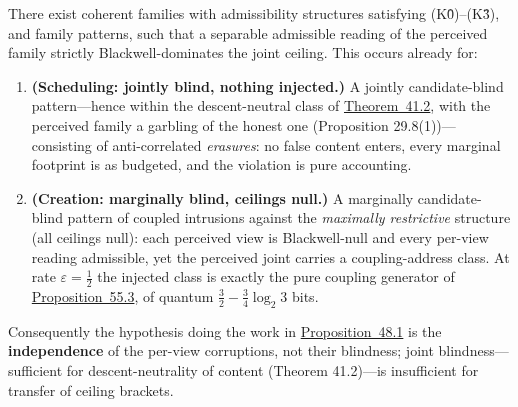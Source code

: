 \begin{thmplain}

There exist coherent families with admissibility structures satisfying (K0̂)--(K3̂), and family patterns, such that a separable admissible reading of the perceived family strictly Blackwell-dominates the joint ceiling. This occurs already for:

\begin{enumerate}
\def\labelenumi{\arabic{enumi}.}
\tightlist
\item
  \textbf{(Scheduling: jointly blind, nothing injected.)} A jointly candidate-blind pattern---\hspace{0pt}hence within the descent-neutral class of \hyperlink{stmt:41.2}{Theorem~41.2}, with the perceived family a garbling of the honest one (Proposition 29.8(1))---\hspace{0pt}consisting of anti-correlated \emph{erasures}: no false content enters, every marginal footprint is as budgeted, and the violation is pure accounting.
\item
  \textbf{(Creation: marginally blind, ceilings null.)} A marginally candidate-blind pattern of coupled intrusions against the \emph{maximally restrictive} structure (all ceilings null): each perceived view is Blackwell-null and every per-view reading admissible, yet the perceived joint carries a coupling-address class. At rate \(\varepsilon = \tfrac12\) the injected class is exactly the pure coupling generator of \hyperlink{stmt:55.3}{Proposition~55.3}, of quantum \(\tfrac32 - \tfrac34 \log_2 3\) bits.
\end{enumerate}

Consequently the hypothesis doing the work in \hyperlink{stmt:48.1}{Proposition~48.1} is the \textbf{independence} of the per-view corruptions, not their blindness; joint blindness---\hspace{0pt}sufficient for descent-neutrality of content (Theorem 41.2)---\hspace{0pt}is insufficient for transfer of ceiling brackets.
\end{thmplain}

